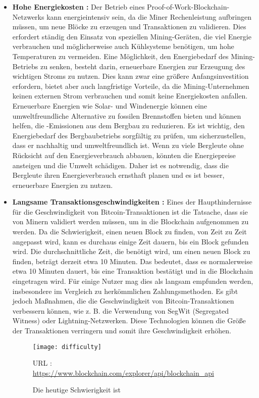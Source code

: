 \documentclass[ngerman]{scrreprt}
\begin{document}
\begin{itemize}
	\item \textbf{Hohe Energiekosten :} Der Betrieb eines Proof-of-Work-Blockchain-Netzwerks kann energieintensiv sein, da die Miner Rechenleistung aufbringen müssen, um neue Blöcke zu erzeugen und Transaktionen zu validieren. Dies erfordert ständig den Einsatz von speziellen Mining-Geräten, die viel Energie verbrauchen und möglicherweise auch Kühlsysteme benötigen, um hohe Temperaturen zu vermeiden. Eine Möglichkeit, den Energiebedarf des Mining-Betriebs zu senken, besteht darin, erneuerbare Energien zur Erzeugung des wichtigen Stroms zu nutzen. Dies kann zwar eine größere Anfangsinvestition erfordern, bietet aber auch langfristige Vorteile, da die Mining-Unternehmen keinen externen Strom verbrauchen und somit keine Energiekosten anfallen. Erneuerbare Energien wie Solar- und Windenergie können eine umweltfreundliche Alternative zu fossilen Brennstoffen bieten und können helfen, die -Emissionen aus dem Bergbau zu reduzieren. Es ist wichtig, den Energiebedarf des Bergbaubetriebs sorgfältig zu prüfen, um sicherzustellen, dass er nachhaltig und umweltfreundlich ist. Wenn zu viele Bergleute ohne Rücksicht auf den Energieverbrauch abbauen, könnten die Energiepreise ansteigen und die Umwelt schädigen. Daher ist es notwendig, dass die Bergleute ihren Energieverbrauch ernsthaft planen und es ist besser, erneuerbare Energien zu nutzen.
	
	\item \textbf{Langsame Transaktionsgeschwindigkeiten :} Eines der Haupthindernisse für die Geschwindigkeit von Bitcoin-Transaktionen ist die Tatsache, dass sie von Minern validiert werden müssen, um in die Blockchain aufgenommen zu werden. Da die Schwierigkeit, einen neuen Block zu finden, von Zeit zu Zeit angepasst wird, kann es durchaus einige Zeit dauern, bis ein Block gefunden wird. Die durchschnittliche Zeit, die benötigt wird, um einen neuen Block zu finden, beträgt derzeit etwa 10 Minuten. Das bedeutet, dass es normalerweise etwa 10 Minuten dauert, bis eine Transaktion bestätigt und in die Blockchain eingetragen wird. Für einige Nutzer mag dies als langsam empfunden werden, insbesondere im Vergleich zu herkömmlichen Zahlungsmethoden. Es gibt jedoch Maßnahmen, die die Geschwindigkeit von Bitcoin-Transaktionen verbessern können, wie z. B. die Verwendung von SegWit (Segregated Witness) oder Lightning-Netzwerken. Diese Technologien können die Größe der Transaktionen verringern und somit ihre Geschwindigkeit erhöhen.
	\begin{figure}[H]
		\centering
		\texttt{[image: difficulty]}
		\caption{Die heutige Schwierigkeit ist}
		\small URL : \url{https://www.blockchain.com/explorer/api/blockchain_api}
	\end{figure} 


\end{itemize}
\end{document}
